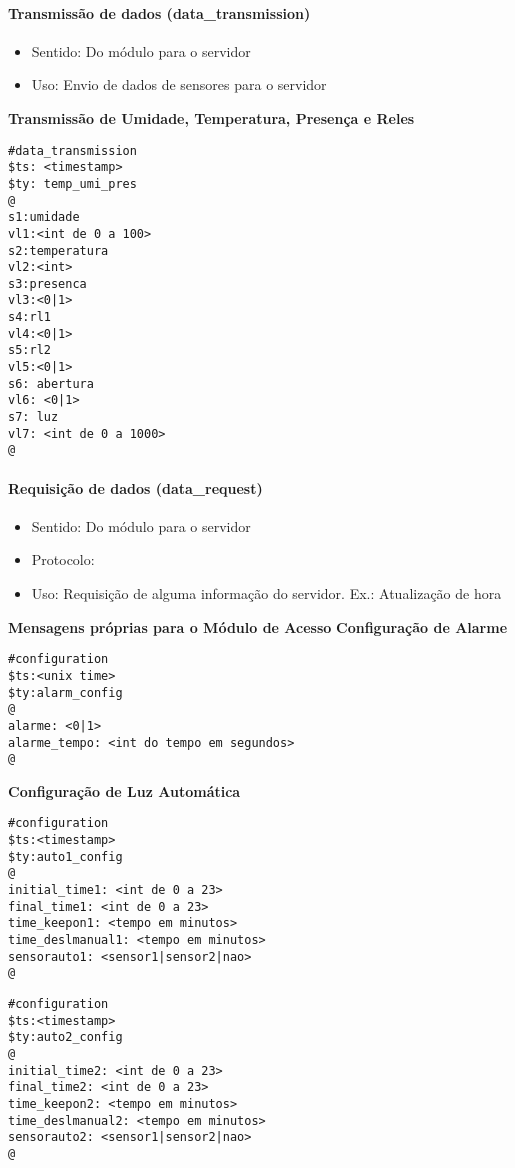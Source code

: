 \paragraph{Transmissão de dados (data\_transmission)}
\begin{itemize}
\item Sentido: Do módulo para o servidor
\item Uso: Envio de dados de sensores para o servidor
\end{itemize}

\textbf{Transmissão de Umidade, Temperatura, Presença e Reles}
\begin{lstlisting}
#data_transmission
$ts: <timestamp>
$ty: temp_umi_pres
@
s1:umidade
vl1:<int de 0 a 100>
s2:temperatura
vl2:<int>
s3:presenca
vl3:<0|1>
s4:rl1
vl4:<0|1>
s5:rl2
vl5:<0|1>
s6: abertura
vl6: <0|1>
s7: luz
vl7: <int de 0 a 1000>
@
\end{lstlisting}

\paragraph{Requisição de dados (data\_request)}
\begin{itemize}
\item Sentido: Do módulo para o servidor
\item Protocolo: \wmqtt{}
\item Uso: Requisição de alguma informação do servidor. Ex.: Atualização de hora
\end{itemize}


\textbf{Mensagens próprias para o Módulo de Acesso}
\textbf{Configuração de Alarme}
\begin{lstlisting}
#configuration
$ts:<unix time>
$ty:alarm_config
@
alarme: <0|1>
alarme_tempo: <int do tempo em segundos>
@
\end{lstlisting}

\textbf{Configuração de Luz Automática}
\begin{lstlisting}
#configuration
$ts:<timestamp>
$ty:auto1_config
@
initial_time1: <int de 0 a 23>
final_time1: <int de 0 a 23>
time_keepon1: <tempo em minutos>
time_deslmanual1: <tempo em minutos>
sensorauto1: <sensor1|sensor2|nao>
@
\end{lstlisting}

\begin{lstlisting}
#configuration
$ts:<timestamp>
$ty:auto2_config
@
initial_time2: <int de 0 a 23>
final_time2: <int de 0 a 23>
time_keepon2: <tempo em minutos>
time_deslmanual2: <tempo em minutos>
sensorauto2: <sensor1|sensor2|nao>
@
\end{lstlisting}

